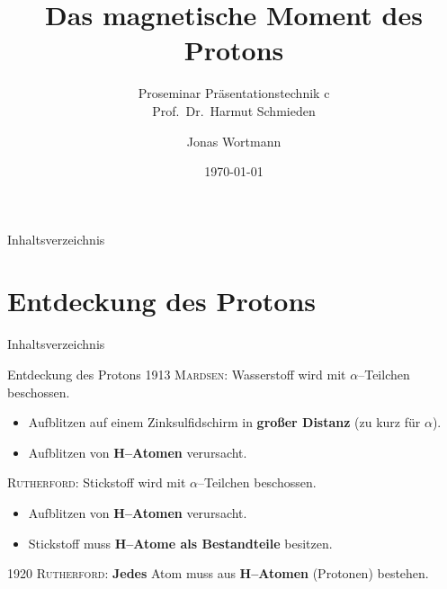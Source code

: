 \documentclass[t,9pt]{beamer}
\title[\thesection]{Das magnetische Moment des Protons}
\subtitle{Proseminar Präsentationstechnik c \\\tiny Prof.\ Dr.\ Harmut Schmieden}
\author{Jonas Wortmann}
\institute{Universität Bonn}
\date{\today}
\begin{document}

        \begin{frame}
                \titlepage
        \end{frame}

        \begin{frame}{Inhaltsverzeichnis}
                \tableofcontents[pausesections]
        \end{frame}

        \section{Entdeckung des Protons}

        \begin{frame}{Inhaltsverzeichnis}
                \tableofcontents[currentsection]
        \end{frame}

        \begin{frame}{Entdeckung des Protons}
                1913 \textsc{Mardsen}: Wasserstoff wird mit $\alpha $--Teilchen beschossen.
                \begin{itemize}
                        \item Aufblitzen auf einem Zinksulfidschirm in \textbf{großer Distanz} (zu kurz für $\alpha $).
                        \item Aufblitzen von \textbf{H--Atomen} verursacht.
                \end{itemize}
                \pause
                \vspace{.5cm} \textsc{Rutherford}: Stickstoff wird mit $\alpha $--Teilchen beschossen.
                \begin{itemize}
                        \item Aufblitzen von \textbf{H--Atomen} verursacht.
                                \pause
                        \item Stickstoff muss \textbf{H--Atome als Bestandteile} besitzen.
                \end{itemize}
                \pause
                \vspace{.5cm}1920 \textsc{Rutherford}: \textbf{Jedes} Atom muss aus \textbf{H--Atomen} (Protonen) bestehen.\cite{Rutherford_proton_discovery}
        \end{frame}
\end{document}
